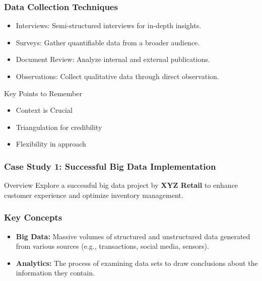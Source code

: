 \documentclass[aspectratio=169]{beamer}
\begin{document}
\begin{frame}[fragile]
    \frametitle{Data Collection Techniques}
    \begin{itemize}
        \item Interviews: Semi-structured interviews for in-depth insights.
        \item Surveys: Gather quantifiable data from a broader audience.
        \item Document Review: Analyze internal and external publications.
        \item Observations: Collect qualitative data through direct observation.
    \end{itemize}

    \begin{block}{Key Points to Remember}
        \begin{itemize}
            \item Context is Crucial
            \item Triangulation for credibility
            \item Flexibility in approach
        \end{itemize}
    \end{block}
\end{frame}

\begin{frame}[fragile]
    \frametitle{Case Study 1: Successful Big Data Implementation}
    
    \begin{block}{Overview}
        Explore a successful big data project by \textbf{XYZ Retail} to enhance customer experience and optimize inventory management.
    \end{block}
\end{frame}

\begin{frame}[fragile]
    \frametitle{Key Concepts}
    
    \begin{itemize}
        \item \textbf{Big Data:} Massive volumes of structured and unstructured data generated from various sources (e.g., transactions, social media, sensors).
        \item \textbf{Analytics:} The process of examining data sets to draw conclusions about the information they contain.
    \end{itemize}
\end{frame}
\end{document}
